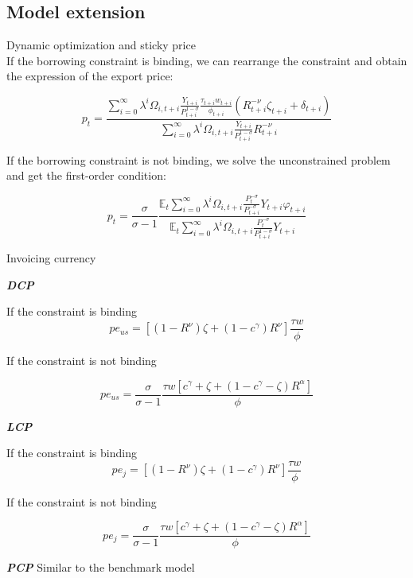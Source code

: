 \documentclass[10pt]{beamer}
\begin{document}
\subsection{Model extension}



\begin{frame}[label=appendix_model_extension]{Dynamic optimization and sticky price} 
\hyperlink{model_extension}{}\\
If the borrowing constraint is binding, we can rearrange the constraint and obtain the expression of the export price:

\begin{equation}
p_t=\frac{\sum_{i=0}^{\infty} \lambda^i \Omega_{i,t+i}\frac{Y_{t+i}}{P_{t+i}^{1-\sigma}}\frac{\tau_{t+i}w_{t+i}}{\phi_{t+i}}(R_{t+i}^{-\nu}\zeta_{t+i}+\delta_{t+i})}{\sum_{i=0}^{\infty} \lambda^i \Omega_{i,t+i}\frac{Y_{t+i}}{P_{t+i}^{1-\sigma}}R_{t+i}^{-\nu}}
\end{equation}

If the borrowing constraint is not binding, we solve the unconstrained problem and get the first-order condition:

\begin{equation}
p_t=\frac{\sigma}{\sigma-1}\frac{\mathbb{E}_t \sum_{i=0}^{\infty} \lambda^i \Omega_{i,t+i}\frac{P_t^{-\sigma}}{P_{t+i}^{-\sigma}}Y_{t+i}\varphi_{t+i}}{\mathbb{E}_t \sum_{i=0}^{\infty} \lambda^i \Omega_{i,t+i}\frac{P_t^{-\sigma}}{P_{t+i}^{1-\sigma}}Y_{t+i}}
\end{equation}

\end{frame}



\begin{frame}{Invoicing currency}


\textbf{\textit{DCP}}

If the constraint is binding
$$
pe_{us}=[(1-R^{\nu})\zeta+(1-c^\gamma)R^{\nu}] \frac{\tau w}{\phi}
$$

If the constraint is not binding

$$
pe_{us}=\frac{\sigma}{\sigma-1}\frac{\tau w [c^\gamma+\zeta+(1-c^\gamma-\zeta) R^\alpha]}{\phi}
$$

\textbf{\textit{LCP}}

If the constraint is binding
$$
pe_{j}=[(1-R^{\nu})\zeta+(1-c^\gamma)R^{\nu}] \frac{\tau w}{\phi}
$$

If the constraint is not binding

$$
pe_{j}=\frac{\sigma}{\sigma-1}\frac{\tau w [c^\gamma+\zeta+(1-c^\gamma-\zeta) R^\alpha]}{\phi}
$$

\textbf{\textit{PCP}}
Similar to the benchmark model

\end{frame}
\end{document}
